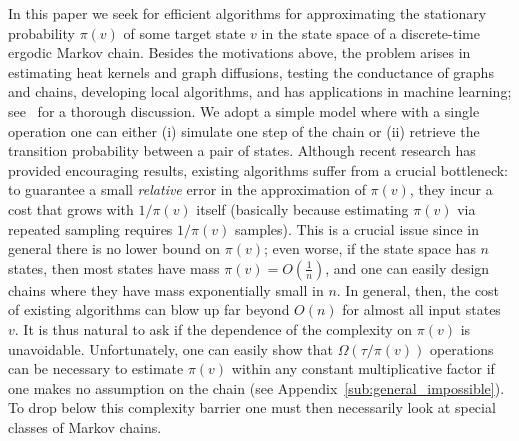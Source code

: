 \documentclass[a4paper,11pt]{article}
\begin{document}
In this paper we seek for efficient algorithms for approximating the stationary probability $\pi(v)$ of some target state $v$ in the state space of a discrete-time ergodic Markov chain.
Besides the motivations above, the problem arises in estimating heat kernels and graph diffusions, testing the conductance of graphs and chains, developing local algorithms, and has applications in machine learning; see~\cite{Lofgren&2015b,Lee&2013} for a thorough discussion.
We adopt a simple model where with a single operation one can either (i) simulate one step of the chain or (ii) retrieve the transition probability between a pair of states.
Although recent research has provided encouraging results, existing algorithms suffer from a crucial bottleneck: to guarantee a small \emph{relative} error in the approximation of $\pi(v)$, they incur a cost that grows with $1/\pi(v)$ itself (basically because estimating $\pi(v)$ via repeated sampling requires $1/\pi(v)$ samples).
This is a crucial issue since in general there is no lower bound on $\pi(v)$; even worse, if the state space has $n$ states, then most states have mass $\pi(v) = O(\frac{1}{n})$, and one can easily design chains where they have mass exponentially small in $n$.
In general, then, the cost of existing algorithms can blow up far beyond $O(n)$ for almost all input states $v$.
It is thus natural to ask if the dependence of the complexity on $\pi(v)$ is unavoidable.
Unfortunately, one can easily show that $\Omega(\tau/\pi(v))$ operations can be necessary to estimate $\pi(v)$ within any constant multiplicative factor if one makes no assumption on the chain (see Appendix~\ref{sub:general_impossible}).
To drop below this complexity barrier one must then necessarily look at special classes of Markov chains.
\end{document}

